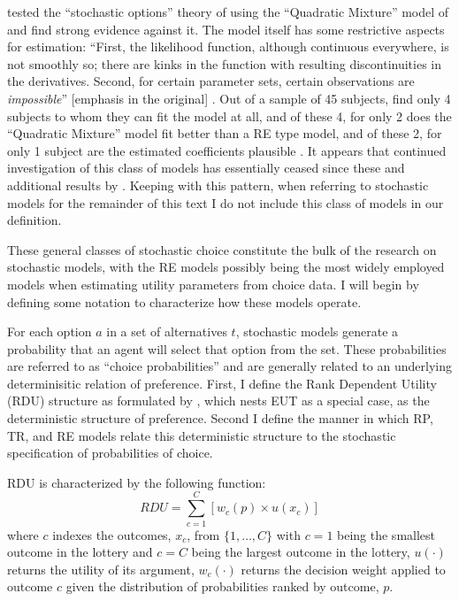\documentclass[../main.tex]{subfiles}
\begin{document}
\textcite{Hey1995} tested the \enquote{stochastic options} theory of \textcite{Machina1985} using the \enquote{Quadratic Mixture} model of \textcite{Chew1991} and find strong evidence against it.
The model itself has some restrictive aspects for estimation: \enquote{First, the likelihood function, although continuous everywhere, is not smoothly so; there are kinks in the function with resulting discontinuities in the derivatives.
Second, for certain parameter sets, certain observations are \textit{impossible}} [emphasis in the original] \parencite*[164]{Hey1995}.
Out of a sample of 45 subjects, \textcite{Hey1995} find only 4 subjects to whom they can fit the model at all, and of these 4, for only 2 does the \enquote{Quadratic Mixture} model fit better than a RE type model, and of these 2, for only 1 subject are the estimated coefficients plausible \parencite*[167]{Hey1995}.
It appears that continued investigation of this class of models has essentially ceased since these and additional results by \textcite{Camerer1994}.
Keeping with this pattern, when referring to stochastic models for the remainder of this text I do not include this class of models in our definition.

These general classes of stochastic choice constitute the bulk of the research on stochastic models, with the RE models possibly being the most widely employed models when estimating utility parameters from choice data.
I will begin by defining some notation to characterize how these models operate.

For each option $a$ in a set of alternatives $t$, stochastic models generate a probability that an agent will select that option from the set.
These probabilities are referred to as \enquote{choice probabilities} and are generally related to an underlying determinisitic relation of preference.
First, I define the Rank Dependent Utility (RDU) structure as formulated by \textcite{Quiggin1982}, which nests EUT as a special case, as the deterministic structure of preference.
Second I define the manner in which RP, TR, and RE  models relate this deterministic structure to the stochastic specification of probabilities of choice.

RDU is characterized by the following function:
\begin{equation}
	\label{eq2:RDU}
	RDU = \sum_{c=1}^{C} \left[ w_c(p) \times u(x_c) \right]
\end{equation}
\noindent where $c$ indexes the outcomes, $x_c$, from $\{1,\ldots,C\}$ with $c=1$ being the smallest outcome in the lottery and $c=C$ being the largest outcome in the lottery, $u(\cdot)$ returns the utility of its argument, $w_c(\cdot)$ returns the decision weight applied to outcome $c$ given the distribution of probabilities ranked by outcome, $p$.
\end{document}

